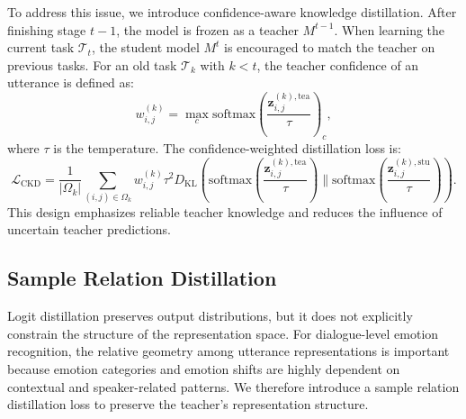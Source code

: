 To address this issue, we introduce confidence-aware knowledge distillation. After finishing stage $t-1$, the model is frozen as a teacher $M^{t-1}$. When learning the current task $\mathcal{T}_t$, the student model $M^t$ is encouraged to match the teacher on previous tasks. For an old task $\mathcal{T}_k$ with $k<t$, the teacher confidence of an utterance is defined as:
\begin{equation}
    w^{(k)}_{i,j}
    =
    \max_c
    \mathrm{softmax}\left(\frac{\mathbf{z}^{(k),\mathrm{tea}}_{i,j}}{\tau}\right)_c,
\end{equation}
where $\tau$ is the temperature. The confidence-weighted distillation loss is:
\begin{equation}
    \mathcal{L}_{\mathrm{CKD}}
    =
    \frac{1}{|\Omega_k|}
    \sum_{(i,j)\in\Omega_k}
    w^{(k)}_{i,j}
    \tau^2
    D_{\mathrm{KL}}
    \left(
    \mathrm{softmax}\left(\frac{\mathbf{z}^{(k),\mathrm{tea}}_{i,j}}{\tau}\right)
    \|
    \mathrm{softmax}\left(\frac{\mathbf{z}^{(k),\mathrm{stu}}_{i,j}}{\tau}\right)
    \right).
\end{equation}
This design emphasizes reliable teacher knowledge and reduces the influence of uncertain teacher predictions.

\subsection{Sample Relation Distillation}
\label{subsec:relation_distillation}

Logit distillation preserves output distributions, but it does not explicitly constrain the structure of the representation space. For dialogue-level emotion recognition, the relative geometry among utterance representations is important because emotion categories and emotion shifts are highly dependent on contextual and speaker-related patterns. We therefore introduce a sample relation distillation loss to preserve the teacher's representation structure.

